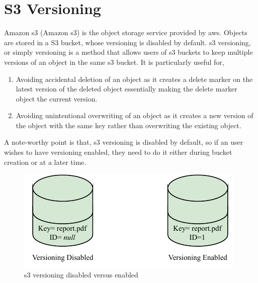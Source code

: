 \documentclass{home_assignment}
\begin{document}
    \tableofcontents
    \clearpage
    \listoffigures
    \clearpage
    \printglossary[type=\acronymtype,nonumberlist,title={List of Abbreviations}]
    \clearpage
    \section{S3 Versioning}
    Amazon \acrlong{s3} (Amazon \acrshort{s3}) is the object storage service provided by \acrshort{aws}. Objects are stored in a S3 bucket, whose versioning is disabled by default. \acrshort{s3} versioning, or simply versioning is a method that allows users of \acrshort{s3} buckets to keep multiple versions of an object in the same \acrshort{s3} bucket. It is particularly useful for,
    \begin{enumerate}
        \item Avoiding accidental deletion of an object as it creates a delete marker on the latest version of the deleted object essentially making the delete marker object the current version.
        \item Avoiding unintentional overwriting of an object as it creates a new version of the object with the same key rather than overwriting the existing object.
    \end{enumerate}
    A note-worthy point is that, \acrshort{s3} versioning is disabled by default, so if an user wishes to have versioning enabled, they need to do it either during bucket creation or at a later time. 
    \begin{figure}[H]
        \centering
        \includegraphics[scale=1.3]{../Figures/versioning_enabled}
        \caption{\acrshort{s3} versioning disabled versus enabled}
        \label{fig:enabled}
    \end{figure}
\end{document}
